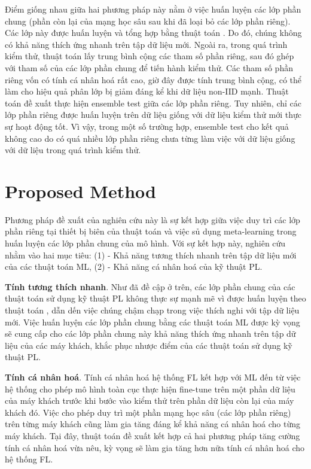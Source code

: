 \documentclass[runningheads]{llncs}
\begin{document}
Điểm giống nhau giữa hai phương pháp này nằm ở việc huấn luyện các lớp phần chung (phần còn lại của mạng học sâu sau khi đã loại bỏ các lớp phần riêng). Các lớp này được huấn luyện và tổng hợp bằng thuật toán . Do đó, chúng không có khả năng thích ứng nhanh trên tập dữ liệu mới. Ngoài ra, trong quá trình kiểm thử, thuật toán  lấy trung bình cộng các tham số phần riêng, sau đó ghép với tham số của các lớp phần chung để tiến hành kiểm thử. Các tham số phần riêng vốn có tính cá nhân hoá rất cao, giờ đây được tính trung bình cộng, có thể làm cho hiệu quả phân lớp bị giảm đáng kể khi dữ liệu non-IID mạnh. Thuật toán  đề xuất thực hiện ensemble test giữa các lớp phần riêng. Tuy nhiên, chỉ các lớp phần riêng được huấn luyện trên dữ liệu giống với dữ liệu kiểm thử mới thực sự hoạt động tốt. Vì vậy, trong một số trường hợp, ensemble test cho kết quả không cao do có quá nhiều lớp phần riêng chưa từng làm việc với dữ liệu giống với dữ liệu trong quá trình kiểm thử.

\section{Proposed Method}

Phương pháp đề xuất của nghiên cứu này là sự kết hợp giữa việc duy trì các lớp phần riêng tại thiết bị biên của thuật toán  và việc sủ dụng meta-learning trong huấn luyện các lớp phần chung của mô hình. Với sự kết hợp này, nghiên cứu nhằm vào hai mục tiêu: (1) - Khả năng tương thích nhanh trên tập dữ liệu mới của các thuật toán ML, (2) - Khả năng cá nhân hoá của kỹ thuật PL.

\textbf{Tính tương thích nhanh}. Như đã đề cập ở trên, các lớp phần chung của các thuật toán sử dụng kỹ thuật PL không thực sự mạnh mẽ vì được huấn luyện theo thuật toán , dẫn dến việc chúng chậm chạp trong việc thích nghi với tập dữ liệu mới. Việc huấn luyện các lớp phần chung bằng các thuật toán ML được kỳ vọng sẽ cung cấp cho các lớp phần chung này khả năng thích ứng nhanh trên tập dữ liệu của các máy khách, khắc phục nhược điểm của các thuật toán sử dụng kỹ thuật PL.

\textbf{Tính cá nhân hoá}. Tính cá nhân hoá hệ thống FL kết hợp với ML đến từ việc hệ thống cho phép mô hình toàn cục thực hiện fine-tune trên một phần dữ liệu của máy khách trước khi bước vào kiểm thử trên phần dữ liệu còn lại của máy khách đó. Việc cho phép duy trì một phần mạng học sâu (các lớp phần riêng) trên từng máy khách cũng làm gia tăng đáng kể khả năng cá nhân hoá cho từng máy khách. Tại đây, thuật toán đề xuất kết hợp cả hai phương pháp tăng cường tính cá nhân hoá vừa nêu, kỳ vọng sẽ làm gia tăng hơn nữa tính cá nhân hoá cho hệ thống FL.
\end{document}
